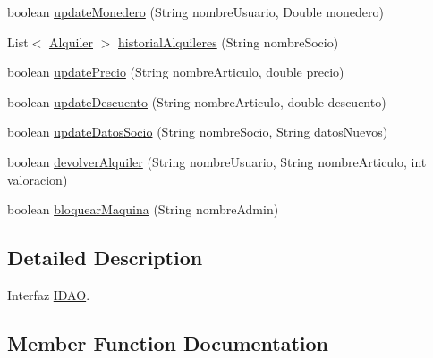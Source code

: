 \begin{DoxyCompactItemize}
\item 
boolean \mbox{\hyperlink{interfacees_1_1deusto_1_1server_1_1db_1_1_i_d_a_o_a59a5efa0070985e6baa0d2890b9ac266}{update\+Monedero}} (String nombre\+Usuario, Double monedero)
\item 
List$<$ \mbox{\hyperlink{classes_1_1deusto_1_1client_1_1data_1_1_alquiler}{Alquiler}} $>$ \mbox{\hyperlink{interfacees_1_1deusto_1_1server_1_1db_1_1_i_d_a_o_a693bc26b74c79a8e02bcfc4ca472f078}{historial\+Alquileres}} (String nombre\+Socio)
\item 
boolean \mbox{\hyperlink{interfacees_1_1deusto_1_1server_1_1db_1_1_i_d_a_o_ae00eb9c5a9caa20fc72cad7b8054ce17}{update\+Precio}} (String nombre\+Articulo, double precio)
\item 
boolean \mbox{\hyperlink{interfacees_1_1deusto_1_1server_1_1db_1_1_i_d_a_o_acacb303b116d7f8f53b5b60f3e647203}{update\+Descuento}} (String nombre\+Articulo, double descuento)
\item 
boolean \mbox{\hyperlink{interfacees_1_1deusto_1_1server_1_1db_1_1_i_d_a_o_a1e999400f9494d0860c70338fa87271b}{update\+Datos\+Socio}} (String nombre\+Socio, String datos\+Nuevos)
\item 
boolean \mbox{\hyperlink{interfacees_1_1deusto_1_1server_1_1db_1_1_i_d_a_o_a8aaee8580b14a10dfa8e495d1c3cd15d}{devolver\+Alquiler}} (String nombre\+Usuario, String nombre\+Articulo, int valoracion)
\item 
boolean \mbox{\hyperlink{interfacees_1_1deusto_1_1server_1_1db_1_1_i_d_a_o_a45cf535d7992afcdf52a1d2b3efe9d1f}{bloquear\+Maquina}} (String nombre\+Admin)
\end{DoxyCompactItemize}


\subsection{Detailed Description}
Interfaz \mbox{\hyperlink{interfacees_1_1deusto_1_1server_1_1db_1_1_i_d_a_o}{I\+D\+AO}}. 

\subsection{Member Function Documentation}
\mbox{\label{interfacees_1_1deusto_1_1server_1_1db_1_1_i_d_a_o_a45cf535d7992afcdf52a1d2b3efe9d1f}} 
